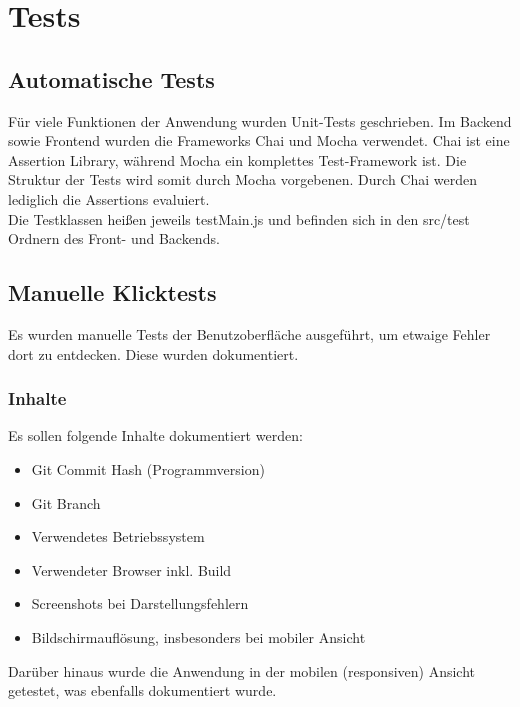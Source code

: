\section{Tests}\label{Tests}
\subsection{Automatische Tests}
Für viele Funktionen der Anwendung wurden Unit-Tests geschrieben.
Im Backend sowie Frontend wurden die Frameworks Chai und Mocha verwendet.
Chai ist eine Assertion Library, während Mocha ein komplettes Test-Framework ist.
Die Struktur der Tests wird somit durch Mocha vorgebenen.
Durch Chai werden lediglich die Assertions evaluiert.
\\
Die Testklassen heißen jeweils testMain.js und befinden sich in den src/test Ordnern des Front- und Backends.

\subsection{Manuelle Klicktests}
Es wurden manuelle Tests der Benutzoberfläche ausgeführt, um etwaige Fehler dort zu entdecken.
Diese wurden dokumentiert.
\subsubsection{Inhalte}
Es sollen folgende Inhalte dokumentiert werden:
\begin{itemize}
    \item Git Commit Hash (Programmversion)
    \item Git Branch
    \item Verwendetes Betriebssystem
    \item Verwendeter Browser inkl. Build
    \item Screenshots bei Darstellungsfehlern
    \item Bildschirmauflösung, insbesonders bei mobiler Ansicht
\end{itemize}
Darüber hinaus wurde die Anwendung in der mobilen (responsiven) Ansicht getestet, was ebenfalls dokumentiert wurde.


